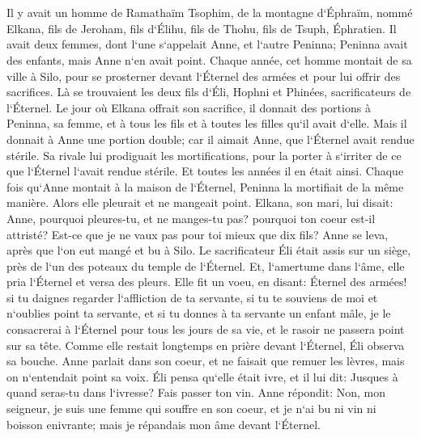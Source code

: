 

\chapter{}

\verse Il y avait un homme de Ramathaïm Tsophim, de la montagne d`Éphraïm, nommé Elkana, fils de Jeroham, fils d`Élihu, fils de Thohu, fils de Tsuph, Éphratien. 
\verse Il avait deux femmes, dont l`une s`appelait Anne, et l`autre Peninna; Peninna avait des enfants, mais Anne n`en avait point. 
\verse Chaque année, cet homme montait de sa ville à Silo, pour se prosterner devant l`Éternel des armées et pour lui offrir des sacrifices. Là se trouvaient les deux fils d`Éli, Hophni et Phinées, sacrificateurs de l`Éternel. 
\verse Le jour où Elkana offrait son sacrifice, il donnait des portions à Peninna, sa femme, et à tous les fils et à toutes les filles qu`il avait d`elle. 
\verse Mais il donnait à Anne une portion double; car il aimait Anne, que l`Éternel avait rendue stérile. 
\verse Sa rivale lui prodiguait les mortifications, pour la porter à s`irriter de ce que l`Éternel l`avait rendue stérile. 
\verse Et toutes les années il en était ainsi. Chaque fois qu`Anne montait à la maison de l`Éternel, Peninna la mortifiait de la même manière. Alors elle pleurait et ne mangeait point. 
\verse Elkana, son mari, lui disait: Anne, pourquoi pleures-tu, et ne manges-tu pas? pourquoi ton coeur est-il attristé? Est-ce que je ne vaux pas pour toi mieux que dix fils? 
\verse Anne se leva, après que l`on eut mangé et bu à Silo. Le sacrificateur Éli était assis sur un siège, près de l`un des poteaux du temple de l`Éternel. 
\verse Et, l`amertume dans l`âme, elle pria l`Éternel et versa des pleurs. 
\verse Elle fit un voeu, en disant: Éternel des armées! si tu daignes regarder l`affliction de ta servante, si tu te souviens de moi et n`oublies point ta servante, et si tu donnes à ta servante un enfant mâle, je le consacrerai à l`Éternel pour tous les jours de sa vie, et le rasoir ne passera point sur sa tête. 
\verse Comme elle restait longtemps en prière devant l`Éternel, Éli observa sa bouche. 
\verse Anne parlait dans son coeur, et ne faisait que remuer les lèvres, mais on n`entendait point sa voix. Éli pensa qu`elle était ivre, 
\verse et il lui dit: Jusques à quand seras-tu dans l`ivresse? Fais passer ton vin. 
\verse Anne répondit: Non, mon seigneur, je suis une femme qui souffre en son coeur, et je n`ai bu ni vin ni boisson enivrante; mais je répandais mon âme devant l`Éternel. 
